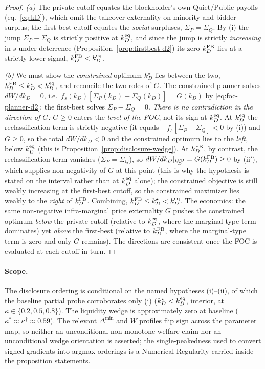 \documentclass[11pt]{article}
\newcommand{\1}{\mathbf{1}}
\begin{document}
\begin{proof}
\emph{(a)} The private cutoff equates the blockholder's own Quiet/Public payoffs
(eq.~\eqref{eq:kD}), which omit the takeover externality on minority and bidder
surplus; the first-best cutoff equates the \emph{social} surpluses,
$\Sigma_P=\Sigma_Q$. By (i) the jump $\Sigma_P-\Sigma_Q$ is strictly positive at
$k_D^{\textup{eq}}$, and since the jump is strictly \emph{increasing} in $s$
under deterrence (Proposition~\ref{prop:firstbest-d2}) its zero
$k_D^{\textup{FB}}$ lies at a strictly lower signal,
$k_D^{\textup{FB}}<k_D^{\textup{eq}}$.

\emph{(b)} We must show the \emph{constrained} optimum $k_D^{\star}$ lies between
the two, $k_D^{\textup{FB}}\le k_D^{\star}<k_D^{\textup{eq}}$, and reconcile the
two roles of $G$. The constrained planner solves $dW/dk_D=0$, i.e.\
$f_s(k_D)[\Sigma_P(k_D)-\Sigma_Q(k_D)]=G(k_D)$ by \eqref{eq:foc-planner-d2}; the
first-best solves $\Sigma_P-\Sigma_Q=0$. \emph{There is no contradiction in the
direction of $G$:} $G\ge0$ enters the \emph{level of the FOC}, not its sign at
$k_D^{\textup{eq}}$. At $k_D^{\textup{eq}}$ the reclassification term is strictly
negative (it equals $-f_s[\Sigma_P-\Sigma_Q]<0$ by (i)) and $G\ge0$, so the total
$dW/dk_D<0$ and the constrained optimum lies to the \emph{left}, below
$k_D^{\textup{eq}}$ (this is Proposition~\ref{prop:disclosure-wedge}). At
$k_D^{\textup{FB}}$, by contrast, the reclassification term vanishes
($\Sigma_P=\Sigma_Q$), so $dW/dk_D|_{k_D^{\textup{FB}}}=G(k_D^{\textup{FB}})\ge0$
by (ii$'$), which supplies non-negativity of $G$ at this point (this is why the
hypothesis is stated on the interval rather than at $k_D^{\textup{eq}}$ alone);
the constrained objective is still weakly increasing at the first-best cutoff, so
the constrained maximizer lies weakly to the \emph{right} of $k_D^{\textup{FB}}$.
Combining, $k_D^{\textup{FB}}\le k_D^{\star}<k_D^{\textup{eq}}$. The economics:
the same non-negative infra-marginal price externality $G$ pushes the constrained
optimum \emph{below} the private cutoff (relative to $k_D^{\textup{eq}}$, where the
marginal-type term dominates) yet \emph{above} the first-best (relative to
$k_D^{\textup{FB}}$, where the marginal-type term is zero and only $G$ remains).
The directions are consistent once the FOC is evaluated at each cutoff in turn.
\end{proof}

\paragraph{Scope.}
The disclosure ordering is conditional on the named hypotheses (i)--(ii), of which
the baseline partial probe corroborates only (i)
($k_D^{\star}<k_D^{\textup{eq}}$, interior, at $\kappa\in\{0.2,0.5,0.8\}$). The
liquidity wedge is approximately zero at baseline
($\kappa^{\ast}\approx\kappa^{\dagger}\approx0.59$). The relevant
$\Delta^{\min}$ and $W$ profiles flip sign across the parameter map, so neither an
unconditional non-monotone-welfare claim nor an unconditional wedge orientation is
asserted; the single-peakedness used to convert signed gradients into argmax
orderings is a Numerical Regularity carried inside the proposition statements.
\end{document}
